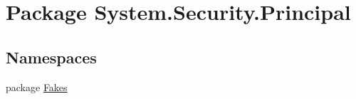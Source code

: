 \hypertarget{namespace_system_1_1_security_1_1_principal}{\section{Package System.\-Security.\-Principal}
\label{namespace_system_1_1_security_1_1_principal}
}
\subsection*{Namespaces}
\begin{DoxyCompactItemize}
\item 
package \hyperlink{namespace_system_1_1_security_1_1_principal_1_1_fakes}{Fakes}
\end{DoxyCompactItemize}
